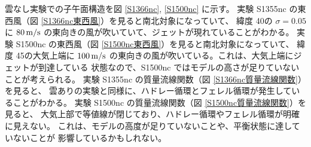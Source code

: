 \documentclass[body]{subfiles}
\begin{document}
雲なし実験での子午面構造を図 \ref{S1366nc}, \ref{S1500nc} に示す。
実験 S1355nc の東西風（図 \ref{S1366nc東西風}）を見ると南北対象になっていて、
緯度 40\textdegree の \(\sigma=0.05\) に \(80\hmu{m/s}\)
の東向きの風が吹いていて、ジェットが現れていることがわかる。
実験 S1500nc の東西風（図 \ref{S1500nc東西風}）を見ると南北対象になっていて、
緯度 45\textdegree の大気上端に \(100\hmu{m/s}\)
の東向きの風が吹いている。これは、大気上端にジェットが到達している
状態なので、S1500nc ではモデルの高さが足りていないことが考えられる。
実験 S1355nc の質量流線関数（図 \ref{S1366nc質量流線関数}）を見ると、
雲ありの実験と同様に、ハドレー循環とフェレル循環が発生していることがわかる。
実験 S1500nc の質量流線関数（図 \ref{S1500nc質量流線関数}）を見ると、
大気上部で等値線が閉じており、ハドレー循環やフェレル循環が明確に見えない。
これは、モデルの高度が足りていないことや、平衡状態に達していないことが
影響しているかもしれない。
\end{document}
